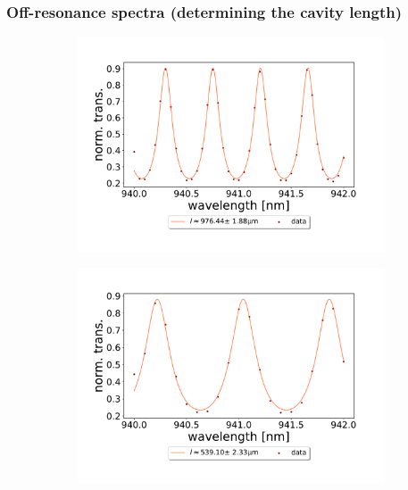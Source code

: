 \subsubsection*{Off-resonance spectra (determining the cavity length)}

\begin{figure}[h!]
    \centering
    \begin{subfigure}[b]{0.49\textwidth}
        \includegraphics[width=\textwidth]{figures/results/double fano fits/1000um_M3:M5_FSR_scan.pdf}
        \caption{}
        \label{fig:1000um_M3:M5_FSR_scan}
    \end{subfigure}
    \begin{subfigure}[b]{0.49\textwidth}
        \includegraphics[width=\textwidth]{figures/results/double fano fits/550um_M3:M5_FSR_scan.pdf}
        \caption{}

\end{subfigure}
\end{figure}
